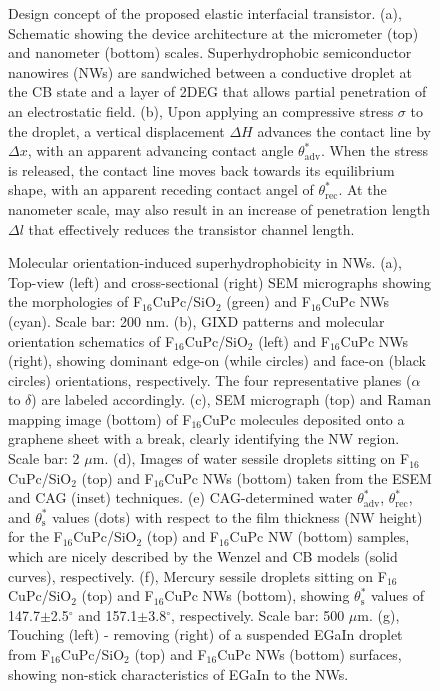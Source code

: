 \begin{figure}[htbp]
\centering
\caption{\label{fig:main-1}
Design concept of the proposed elastic interfacial transistor. (a), Schematic showing the device architecture at the micrometer (top) and nanometer (bottom) scales. Superhydrophobic semiconductor nanowires (NWs) are sandwiched between a conductive droplet at the CB state and a layer of 2DEG that allows partial penetration of an electrostatic field. (b), Upon applying an compressive stress \(\sigma\) to the droplet, a vertical displacement \(\Delta H\) advances the contact line by \(\Delta x\), with an apparent advancing contact angle \(\theta_{\mathrm{adv}}^{*}\). When the stress is released, the contact line moves back towards its equilibrium shape, with an apparent receding contact angel of \(\theta_{\mathrm{rec}}^{*}\). At the nanometer scale,  may also result in an increase of penetration length \(\Delta l\) that effectively reduces the transistor channel length.}
\end{figure}


\begin{figure}[htbp]
\centering
\caption{\label{fig:main-2}
Molecular orientation-induced superhydrophobicity in NWs. (a), Top-view (left) and cross-sectional (right) SEM micrographs showing the morphologies of F\(_{\text{16}}\)CuPc/SiO\(_{\text{2}}\) (green) and F\(_{\text{16}}\)CuPc NWs (cyan). Scale bar: 200 nm. (b), GIXD patterns and molecular orientation schematics of F\(_{\text{16}}\)CuPc/SiO\(_{\text{2}}\) (left) and F\(_{\text{16}}\)CuPc NWs (right), showing dominant edge-on (while circles) and face-on (black circles) orientations, respectively. The four representative planes (\(\alpha\) to \(\delta\)) are labeled accordingly. (c), SEM micrograph (top) and Raman mapping image (bottom) of F\(_{\text{16}}\)CuPc molecules deposited onto a graphene sheet with a break, clearly identifying the NW region. Scale bar: 2 \(\mu\)m. (d), Images of water sessile droplets sitting on F\(_{\text{16}}\)CuPc/SiO\(_{\text{2}}\) (top) and F\(_{\text{16}}\)CuPc NWs (bottom) taken from the ESEM and CAG (inset) techniques. (e) CAG-determined water \(\theta_{\mathrm{adv}}^{*}\), \(\theta_{\mathrm{rec}}^{*}\), and \(\theta_{\mathrm{s}}^{*}\) values (dots) with respect to the film thickness (NW height) for the F\(_{\text{16}}\)CuPc/SiO\(_{\text{2}}\) (top) and F\(_{\text{16}}\)CuPc NW (bottom) samples, which are nicely described by the Wenzel and CB models (solid curves), respectively. (f), Mercury sessile droplets sitting on F\(_{\text{16}}\)CuPc/SiO\(_{\text{2}}\) (top) and F\(_{\text{16}}\)CuPc NWs (bottom), showing \(\theta_{\mathrm{s}}^{*}\) values of 147.7\(\pm\)2.5\(^{\circ}\)  and 157.1\(\pm\)3.8\(^{\circ}\), respectively. Scale bar: 500 \(\mu\)m. (g), Touching (left) - removing (right) of a suspended EGaIn droplet from F\(_{\text{16}}\)CuPc/SiO\(_{\text{2}}\) (top) and F\(_{\text{16}}\)CuPc NWs (bottom) surfaces, showing non-stick characteristics of EGaIn to the NWs.}
\end{figure}


